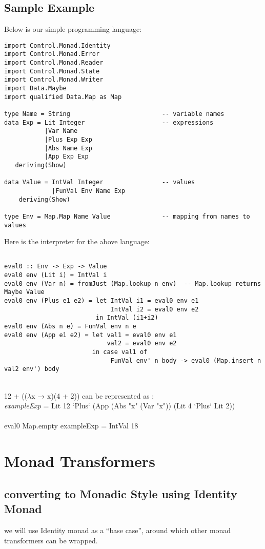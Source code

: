 \documentclass[a4paper,10pt]{article}
\begin{document}
\subsection{Sample Example}
Below is our simple programming language:
\begin{verbatim}
import Control.Monad.Identity
import Control.Monad.Error
import Control.Monad.Reader
import Control.Monad.State
import Control.Monad.Writer
import Data.Maybe
import qualified Data.Map as Map

type Name = String                         -- variable names
data Exp = Lit Integer                     -- expressions
           |Var Name
           |Plus Exp Exp
           |Abs Name Exp
           |App Exp Exp
   deriving(Show)

data Value = IntVal Integer                -- values
             |FunVal Env Name Exp
    deriving(Show)

type Env = Map.Map Name Value              -- mapping from names to values

\end{verbatim}

Here is the interpreter for the above language:
\begin{verbatim}

eval0 :: Env -> Exp -> Value
eval0 env (Lit i) = IntVal i
eval0 env (Var n) = fromJust (Map.lookup n env)  -- Map.lookup returns Maybe Value
eval0 env (Plus e1 e2) = let IntVal i1 = eval0 env e1
                             IntVal i2 = eval0 env e2
                         in IntVal (i1+i2)
eval0 env (Abs n e) = FunVal env n e
eval0 env (App e1 e2) = let val1 = eval0 env e1
                            val2 = eval0 env e2
                        in case val1 of
                             FunVal env' n body -> eval0 (Map.insert n val2 env') body
\end{verbatim}
\\
12 + (($\lambda$x → x)(4 + 2)) can be represented as :                             \\
\textit{exampleExp} = Lit 12 `Plus` (App (Abs "x" (Var "x")) (Lit 4 `Plus` Lit 2))   
\\\\
eval0 Map.empty exampleExp = IntVal 18

\section{Monad Transformers}

\subsection{converting to Monadic Style using Identity Monad}
we will use Identity monad as a “base case”, around which other monad transformers can be wrapped.
\end{document}
